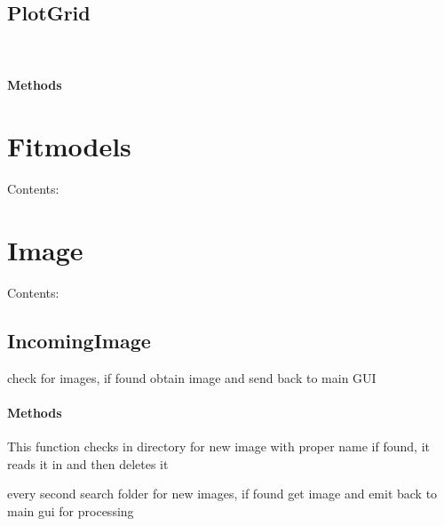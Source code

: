 \documentclass[letterpaper,10pt,english]{sphinxmanual}
\begin{document}
\subsection{PlotGrid}
\label{PlotGrid::doc}\label{PlotGrid:plotgrid}

\begin{fulllineitems}
\label{PlotGrid:Dataplots.PlotGrid}~\paragraph{Methods}

\end{fulllineitems}



\section{Fitmodels}
\label{Fitmodels::doc}\label{Fitmodels:fitmodels}
Contents:


\section{Image}
\label{Image::doc}\label{Image:image}
Contents:


\subsection{IncomingImage}
\label{IncomingImage::doc}\label{IncomingImage:incomingimage}

\begin{fulllineitems}
\label{IncomingImage:Image.IncomingImage}
check for images, if found obtain image and send back to main GUI
\paragraph{Methods}

\begin{fulllineitems}
\label{IncomingImage:Image.IncomingImage.newImage}
This function checks in directory for new image with proper name
if found, it reads it in and then deletes it

\end{fulllineitems}


\begin{fulllineitems}
\label{IncomingImage:Image.IncomingImage.run}
every second search folder for new images, if found
get image and emit back to main gui for processing

\end{fulllineitems}


\end{fulllineitems}
\end{document}
